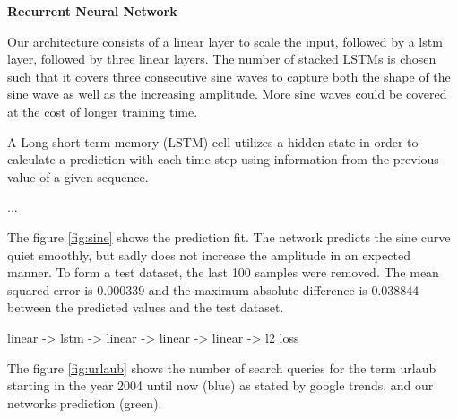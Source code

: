 \documentclass{article}
\begin{document}
\begin{enumerate}
	
	\begin{item}
		\textbf{Recurrent Neural Network}
	\end{item}
	\begin{enumerate}
		
		\begin{item}
			Our architecture consists of a linear layer to scale the input, followed by a lstm layer, followed by three linear layers. The number of stacked LSTMs is chosen such that it covers three consecutive sine waves to capture both the shape of the sine wave as well as the increasing amplitude. More sine waves could be covered at the cost of longer training time.
		\end{item}
		
		
		
		\begin{item}
			A Long short-term memory (LSTM) cell utilizes a hidden state in order to calculate a prediction with each time step using information from the previous value of a given sequence.
			
		\end{item}
		
		\begin{item}
			...
		\end{item}
		
		\begin{item}
			The  figure \ref{fig:sine} shows the prediction fit. The network predicts the sine curve quiet smoothly, but sadly does not increase the amplitude in an expected manner. 
			To form a test dataset,  the last 100 samples were removed. 
			The mean squared error is 0.000339 and the maximum absolute difference is 0.038844 between the predicted values and the test dataset.
	
		\end{item}
		\begin{item}
			linear -> lstm -> linear -> linear -> linear -> l2 loss
		\end{item}
		
		\begin{item}
			The  figure \ref{fig:urlaub} shows the number of search queries for the term urlaub starting in the year 2004 until now (blue) as stated by google trends, and our networks prediction (green).
		\end{item}
	\end{enumerate}

	
\end{enumerate}
\end{document}
